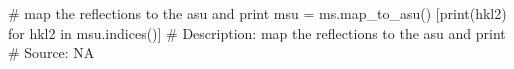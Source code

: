 # map the reflections to the asu and print
msu = ms.map_to_asu()
[print(hkl2) for hkl2 in msu.indices()]
# Description:  map the reflections to the asu and print
# Source:  NA

